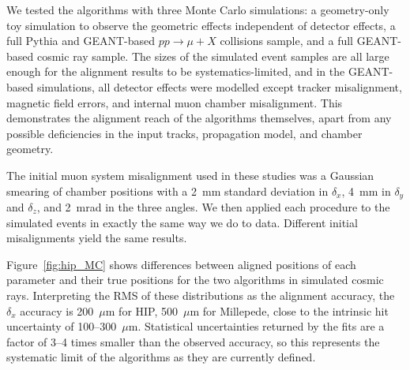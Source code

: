 We tested the algorithms with three Monte Carlo simulations: a
geometry-only toy simulation to observe the geometric effects
independent of detector effects, a full Pythia and GEANT-based
$pp \to \mu + X$ collisions sample, and a full GEANT-based cosmic ray
sample.  The sizes of the simulated event samples are all large enough
for the alignment results to be systematics-limited, and in the
GEANT-based simulations, all detector effects were modelled except
tracker misalignment, magnetic field errors, and internal muon chamber
misalignment.  This demonstrates the alignment reach of the algorithms
themselves, apart from any possible deficiencies in the input
tracks, propagation model, and chamber geometry.

The initial muon system misalignment used in these studies was a
Gaussian smearing of chamber positions with a 2~mm standard deviation in $\delta_x$,
4~mm in $\delta_y$ and $\delta_z$, and 2~mrad in the three angles.  We
then applied each procedure to the simulated events in exactly the
same way we do to data.  Different initial misalignments yield the
same results.

Figure~\ref{fig:hip_MC} shows differences between aligned positions of
each parameter and their true positions for the two algorithms in
simulated cosmic rays.  Interpreting the RMS of these distributions as
the alignment accuracy, the $\delta_x$ accuracy is 200~$\mu$m for HIP,
500~$\mu$m for Millepede, close to the intrinsic hit uncertainty of
100--300~$\mu$m.  Statistical uncertainties returned by the fits are a
factor of 3--4 times smaller than the observed accuracy, so this
represents the systematic limit of the algorithms as they are
currently defined.

